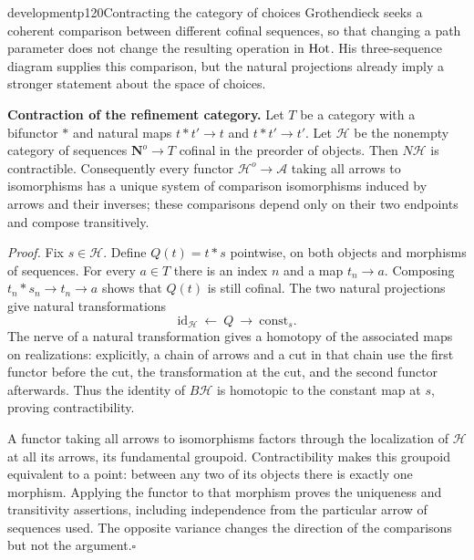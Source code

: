 \begin{dcomment}{development}{p120}{Contracting the category of choices}
Grothendieck seeks a coherent comparison between different cofinal sequences, so that changing a path parameter does not change the resulting operation in $\mathrm{Hot}$. His three-sequence diagram supplies this comparison, but the natural projections already imply a stronger statement about the space of choices.

\textbf{Contraction of the refinement category.}\ours\quad
Let $T$ be a category with a bifunctor $*$ and natural maps $t*t'\to t$ and $t*t'\to t'$. Let $\mathcal H$ be the nonempty category of sequences $\mathbf N^o\to T$ cofinal in the preorder of objects. Then $N\mathcal H$ is contractible. Consequently every functor $\mathcal H^o\to\mathcal A$ taking all arrows to isomorphisms has a unique system of comparison isomorphisms induced by arrows and their inverses; these comparisons depend only on their two endpoints and compose transitively.

\textit{Proof.} Fix $s\in\mathcal H$. Define $Q(t)=t*s$ pointwise, on both objects and morphisms of sequences. For every $a\in T$ there is an index $n$ and a map $t_n\to a$. Composing $t_n*s_n\to t_n\to a$ shows that $Q(t)$ is still cofinal. The two natural projections give natural transformations
\[
 \mathrm{id}_{\mathcal H}\ \longleftarrow\ Q\ \longrightarrow\ \mathrm{const}_s.
\]
The nerve of a natural transformation gives a homotopy of the associated maps on realizations: explicitly, a chain of arrows and a cut in that chain use the first functor before the cut, the transformation at the cut, and the second functor afterwards. Thus the identity of $B\mathcal H$ is homotopic to the constant map at $s$, proving contractibility.

A functor taking all arrows to isomorphisms factors through the localization of $\mathcal H$ at all its arrows, its fundamental groupoid. Contractibility makes this groupoid equivalent to a point: between any two of its objects there is exactly one morphism. Applying the functor to that morphism proves the uniqueness and transitivity assertions, including independence from the particular arrow of sequences used. The opposite variance changes the direction of the comparisons but not the argument.\hfill$\square$


\end{dcomment}
